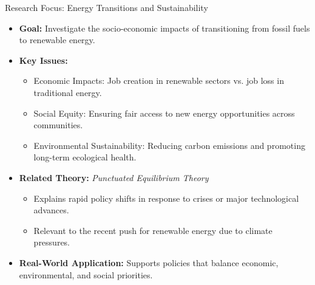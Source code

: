 \documentclass[11pt, aspectratio=169]{beamer}
\begin{document}
\begin{frame}{Research Focus: Energy Transitions and Sustainability}
    \begin{itemize}
        \item \textbf{Goal:} Investigate the socio-economic impacts of transitioning from fossil fuels to renewable energy.
        \item \textbf{Key Issues:}
            \begin{itemize}
                \item Economic Impacts: Job creation in renewable sectors vs. job loss in traditional energy.
                \item Social Equity: Ensuring fair access to new energy opportunities across communities.
                \item Environmental Sustainability: Reducing carbon emissions and promoting long-term ecological health.
            \end{itemize}
        \item \textbf{Related Theory:} \textit{Punctuated Equilibrium Theory}
            \begin{itemize}
                \item Explains rapid policy shifts in response to crises or major technological advances.
                \item Relevant to the recent push for renewable energy due to climate pressures.
            \end{itemize}
        \item \textbf{Real-World Application:} Supports policies that balance economic, environmental, and social priorities.
    \end{itemize}
\end{frame}
\end{document}
